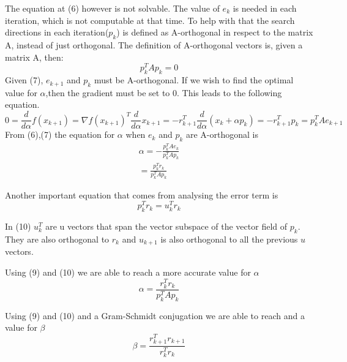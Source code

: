 \documentclass[12pt,a4paper]{article}
\begin{document}
The equation at (6) however is not solvable. The value of $e_k$ is needed in each iteration, which is not computable at that time. To help with that the search directions in each iteration($p_k$) is defined as A-orthogonal in respect to the matrix A, instead of just orthogonal. The definition of A-orthogonal vectors is, given a matrix A, then:
\begin{equation}
p^T_kAp_k=0
\end{equation}
Given (7), $e_{k+1}$ and $p_k$ must be A-orthogonal. If we wish to find the optimal value for $\alpha$,then the gradient must be set to 0. This leads to the following equation.
\begin{equation}
0=\frac{d}{d\alpha}f(x_{k+1})=\nabla f(x_{k+1})^T\frac{d}{d\alpha}x_{k+1} = -r^T_{k+1}\frac{d}{d\alpha}(x_k + \alpha p_k) = -r^T_{k+1}p_k=p^T_kAe_{k+1}
\end{equation}
From (6),(7) the equation for $\alpha$ when $e_k$ and $p_k$ are A-orthogonal is
\begin{equation}
\begin{split}
\alpha =-\frac{p^T_kAe_k}{p^T_kAp_k}\\
=\frac{p^T_kr_k}{p^T_kAp_k}
\end{split}
\end{equation}

Another important equation that comes from analysing the error term is
\begin{equation}
p^T_kr_k=u^T_kr_k
\end{equation}

In (10) $u^T_k$ are u vectors that span the vector subspace of the vector field of $p_k$. They are also orthogonal to $r_k$ and $u_{k+1}$ is also orthogonal to all the previous $u$ vectors.

Using (9) and (10) we are able to reach a more accurate value for $\alpha$
\begin{equation}
\alpha = \frac{r^T_kr_k}{p^T_kAp_k}
\end{equation}

Using (9) and (10) and a Gram-Schmidt conjugation we are able to reach and a value for $\beta$
\begin{equation}
\beta = \frac{r^T_{k+1}r_{k+1}}{r^T_kr_k}
\end{equation}
\newpage
\end{document}
